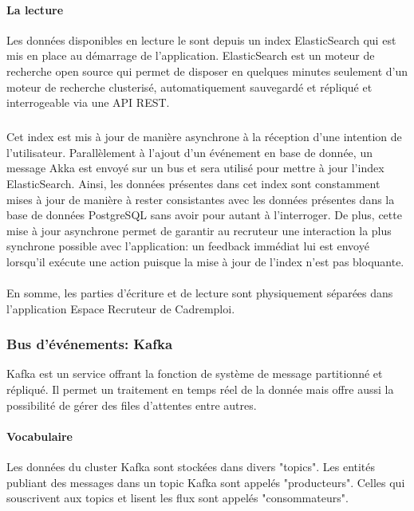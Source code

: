 \paragraph{La lecture}
\label{par:La lecture}
Les données disponibles en lecture le sont depuis un index ElasticSearch qui est mis en place au démarrage de l'application.
ElasticSearch est un moteur de recherche open source qui permet de disposer en quelques minutes seulement d'un moteur de recherche clusterisé, automatiquement sauvegardé et répliqué et interrogeable via une API REST.
\subparagraph{}
Cet index est mis à jour de manière asynchrone à la réception d'une intention de l'utilisateur.
Parallèlement à l'ajout d'un événement en base de donnée, un message Akka est envoyé sur un bus et sera utilisé pour mettre à jour l'index ElasticSearch.
Ainsi, les données présentes dans cet index sont constamment mises à jour de manière à rester consistantes avec les données présentes dans la base de données PostgreSQL sans avoir pour autant à l'interroger.
De plus, cette mise à jour asynchrone permet de garantir au recruteur une interaction la plus synchrone possible avec l'application:
un feedback immédiat lui est envoyé lorsqu'il exécute une action puisque la mise à jour de l'index n'est pas bloquante.

\paragraph{}
En somme, les parties d'écriture et de lecture sont physiquement séparées dans l'application Espace Recruteur de Cadremploi.

\subsubsection{Bus d'événements: Kafka}
\label{subs:Bus d'événements: Kafka}
Kafka est un service offrant la fonction de système de message partitionné et répliqué.
Il permet un traitement en temps réel de la donnée mais offre aussi la possibilité de gérer des files d'attentes entre autres.
\paragraph{Vocabulaire}
\label{par:Vocabulaire}
Les données du cluster Kafka sont stockées dans divers "topics".
Les entités publiant des messages dans un topic Kafka sont appelés "producteurs".
Celles qui souscrivent aux topics et lisent les flux sont appelés "consommateurs".
